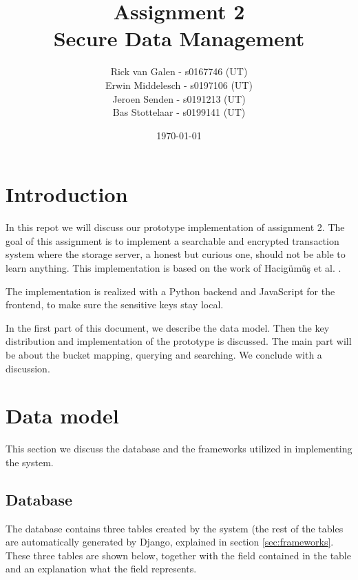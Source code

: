 \documentclass[a4paper]{article}
\begin{document}
\title{Assignment 2 \\ Secure Data Management}
\author{Rick van Galen - s0167746 (UT) \\ Erwin Middelesch - s0197106 (UT) \\ Jeroen Senden - s0191213 (UT) \\ Bas Stottelaar - s0199141 (UT)}
\date{\today}
\maketitle

\section{Introduction}
	In this repot we will discuss our prototype implementation of assignment 2. The goal of this assignment is to implement a searchable and encrypted transaction system where the storage server, a honest but curious one, should not be able to learn anything. This implementation is based on the work of Hacig{\"u}m{\"u}{\c{s}} et al. \cite{hacigumucs2002executing}.
	
	The implementation is realized with a Python backend and JavaScript for the frontend, to make sure the sensitive keys stay local.
	
	In the first part of this document, we describe the data model. Then the key distribution and implementation of the prototype is discussed. The main part will be about the bucket mapping, querying and searching. We conclude with a discussion.

\section{Data model}
	This section we discuss the database and the frameworks utilized in implementing the system.
    
    \subsection{Database}
    	The database contains three tables created by the system (the rest of the tables are automatically generated by Django, explained in section \ref{sec:frameworks}. These three tables are shown below, together with the field contained in the table and an explanation what the field represents.
        
\end{document}
